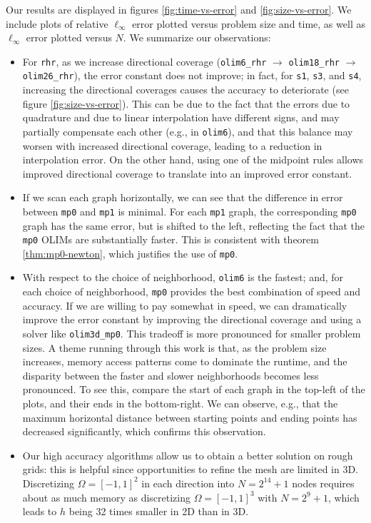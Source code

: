 \documentclass[smallcondensed]{svjour3}
\begin{document}
Our results are displayed in figures \ref{fig:time-vs-error} and
\ref{fig:size-vs-error}. We include plots of relative $\ell_\infty$
error plotted versus problem size and time, as well as $\ell_\infty$
error plotted versus $N$. We summarize our observations:
\begin{itemize}
\item For \texttt{rhr}, as we increase directional coverage
  (\texttt{olim6\_rhr} $\to$ \texttt{olim18\_rhr} $\to$
  \texttt{olim26\_rhr}), the error constant does not improve; in fact,
  for \texttt{s1}, \texttt{s3}, and \texttt{s4}, increasing the
  directional coverages causes the accuracy to deteriorate (see figure
  \ref{fig:size-vs-error}). This can be due to the fact that the
  errors due to quadrature and due to linear interpolation have
  different signs, and may partially compensate each other (e.g., in
  \texttt{olim6}), and that this balance may worsen with increased
  directional coverage, leading to a reduction in interpolation error.
  On the other hand, using one of the midpoint rules allows improved
  directional coverage to translate into an improved error constant.
\item If we scan each graph horizontally, we can see that the
  difference in error between \texttt{mp0} and \texttt{mp1} is
  minimal. For each \texttt{mp1} graph, the corresponding \texttt{mp0}
  graph has the same error, but is shifted to the left, reflecting the
  fact that the \texttt{mp0} OLIMs are substantially faster. This is
  consistent with theorem \ref{thm:mp0-newton}, which justifies the
  use of \texttt{mp0}.
\item With respect to the choice of neighborhood, \texttt{olim6} is
  the fastest; and, for each choice of neighborhood, \texttt{mp0}
  provides the best combination of speed and accuracy. If we are
  willing to pay somewhat in speed, we can dramatically improve the
  error constant by improving the directional coverage and using a
  solver like \texttt{olim3d\_mp0}. This tradeoff is more pronounced
  for smaller problem sizes. A theme running through this work is
  that, as the problem size increases, memory access patterns come to
  dominate the runtime, and the disparity between the faster and
  slower neighborhoods becomes less pronounced. To see this, compare
  the start of each graph in the top-left of the plots, and their ends
  in the bottom-right. We can observe, e.g., that the maximum
  horizontal distance between starting points and ending points has
  decreased significantly, which confirms this observation.
\item Our high accuracy algorithms allow us to obtain a better
  solution on rough grids: this is helpful since opportunities to
  refine the mesh are limited in 3D. Discretizing $\Omega = [-1, 1]^2$
  in each direction into $N = 2^{14} + 1$ nodes requires about as much
  memory as discretizing $\Omega = [-1, 1]^3$ with $N = 2^{9} + 1$,
  which leads to $h$ being 32 times smaller in 2D than in 3D.
\end{itemize}
\end{document}
